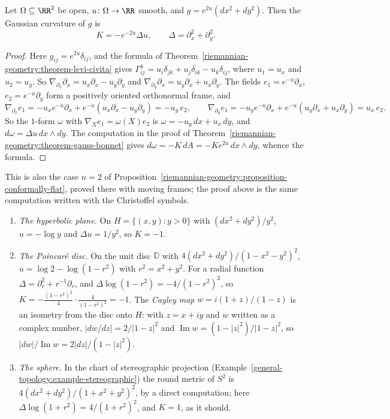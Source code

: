 \begin{proposition}\label{riemannian-geometry:proposition-conformal-curvature}
Let $\Omega \subseteq \RR^2$ be open, $u \colon \Omega \to \RR$ smooth, and $g = e^{2u}(dx^2 + dy^2)$. Then the Gaussian curvature of $g$ is
\[
K = -e^{-2u}\Delta u, \qquad \Delta = \partial_x^2 + \partial_y^2 .
\]
\end{proposition}

\begin{proof}
Here $g_{ij} = e^{2u}\delta_{ij}$, and the formula of Theorem~\ref{riemannian-geometry:theorem-levi-civita} gives
$\Gamma^k_{ij} = u_i\delta_{jk} + u_j\delta_{ik} - u_k\delta_{ij}$, where $u_1 = u_x$ and $u_2 = u_y$. So $\nabla_{\partial_x}\partial_x = u_x\partial_x - u_y\partial_y$ and
$\nabla_{\partial_y}\partial_x = u_y\partial_x + u_x\partial_y$. The fields $e_1 = e^{-u}\partial_x$, $e_2 = e^{-u}\partial_y$ form a positively oriented orthonormal frame, and
\[
\nabla_{\partial_x}e_1 = -u_xe^{-u}\partial_x + e^{-u}(u_x\partial_x - u_y\partial_y) = -u_y\,e_2, \qquad
\nabla_{\partial_y}e_1 = -u_ye^{-u}\partial_x + e^{-u}(u_y\partial_x + u_x\partial_y) = u_x\,e_2 .
\]
So the $1$-form $\omega$ with $\nabla_Xe_1 = \omega(X)e_2$ is $\omega = -u_y\,dx + u_x\,dy$, and $d\omega = \Delta u\,dx \wedge dy$. The computation in the proof of
Theorem~\ref{riemannian-geometry:theorem-gauss-bonnet} gives $d\omega = -K\,dA = -Ke^{2u}\,dx \wedge dy$, whence the formula.
\end{proof}

This is also the case $n = 2$ of Proposition~\ref{riemannian-geometry:proposition-conformally-flat}, proved there with moving frames; the proof above is the same computation written with the
Christoffel symbols.

\begin{example}\label{riemannian-geometry:example-conformal-metrics}
\begin{enumerate}
\item \emph{The hyperbolic plane.} On $H = \{(x, y) : y > 0\}$ with $(dx^2 + dy^2)/y^2$, $u = -\log y$ and $\Delta u = 1/y^2$, so $K = -1$.
\item \emph{The Poincar\'e disc.} On the unit disc $\mathbb{D}$ with $4(dx^2 + dy^2)/(1 - x^2 - y^2)^2$, $u = \log2 - \log(1 - r^2)$ with $r^2 = x^2 + y^2$. For a radial function
$\Delta = \partial_r^2 + r^{-1}\partial_r$, and $\Delta\log(1 - r^2) = -4/(1 - r^2)^2$, so $K = -\frac{(1 - r^2)^2}4 \cdot \frac4{(1 - r^2)^2} = -1$. The \emph{Cayley map}
$w = i(1 + z)/(1 - z)$ is an isometry from the disc onto $H$: with $z = x + iy$ and $w$ written as a complex number, $|dw/dz| = 2/|1 - z|^2$ and
$\operatorname{Im}w = (1 - |z|^2)/|1 - z|^2$, so $|dw|/\operatorname{Im}w = 2|dz|/(1 - |z|^2)$.
\item \emph{The sphere.} In the chart of stereographic projection (Example~\ref{general-topology:example-stereographic}) the round metric of $S^2$ is
$4(dx^2 + dy^2)/(1 + x^2 + y^2)^2$, by a direct computation; here $\Delta\log(1 + r^2) = 4/(1 + r^2)^2$, and $K = 1$, as it should.
\end{enumerate}
\end{example}

